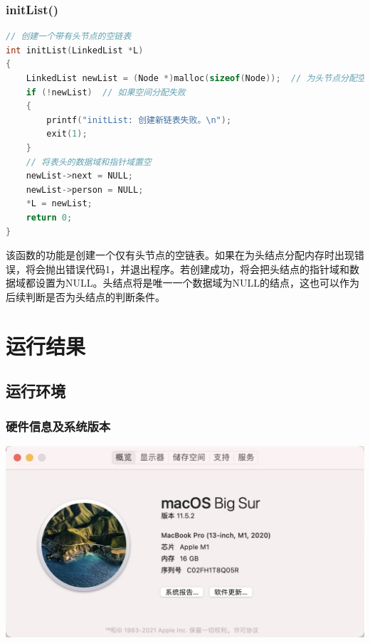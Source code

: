 \documentclass[a4paper,12pt]{report}
\newtheorem{definition}{定义}
\begin{document}
\subsection{initList()}
\begin{lstlisting}[language=C]
// 创建一个带有头节点的空链表
int initList(LinkedList *L)
{
    LinkedList newList = (Node *)malloc(sizeof(Node));  // 为头节点分配空间
    if (!newList)  // 如果空间分配失败
    {
        printf("initList: 创建新链表失败。\n");
        exit(1);
    }
    // 将表头的数据域和指针域置空
    newList->next = NULL;
    newList->person = NULL;
    *L = newList;
    return 0;
}
\end{lstlisting}
该函数的功能是创建一个仅有头节点的空链表。如果在为头结点分配内存时出现错误，将会抛出错误代码1，并退出程序。若创建成功，将会把头结点的指针域和数据域都设置为NULL。头结点将是唯一一个数据域为NULL的结点，这也可以作为后续判断是否为头结点的判断条件。


\chapter{运行结果}

\section{运行环境}
\subsection{硬件信息及系统版本}
\includegraphics[width=1.00\textwidth]{system_info.png}
\end{document}
